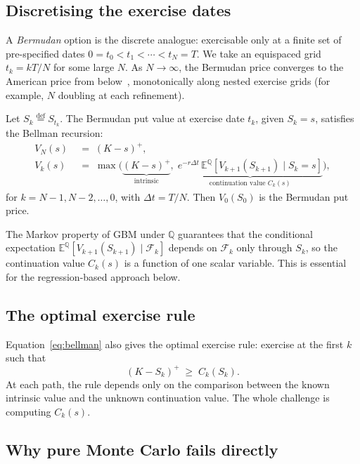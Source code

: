 \documentclass[11pt,a4paper]{article}
\theoremstyle{plain}
\theoremstyle{definition}
\theoremstyle{remark}
\newcommand{\E}{\mathbb{E}}
\newcommand{\F}{\mathcal{F}}
\newcommand{\Q}{\mathbb{Q}}
\newcommand{\eqdef}{\overset{\mathrm{def}}{=}}
\begin{document}
\subsection{Discretising the exercise dates}

A \emph{Bermudan} option is the discrete analogue: exercisable only at
a finite set of pre-specified dates $0 = t_0 < t_1 < \cdots < t_N = T$.
We take an equispaced grid $t_k = kT/N$ for some large $N$. As $N \to
\infty$, the Bermudan price converges to the American price
from below~\cite[Section 8.1]{Glasserman}, monotonically along nested
exercise grids (for example, $N$ doubling at each refinement).

Let $S_k \eqdef S_{t_k}$. The Bermudan put value at exercise date
$t_k$, given $S_k = s$, satisfies the Bellman recursion:
\begin{equation}
\boxed{
\begin{aligned}
V_N(s) \;&=\; (K - s)^+, \\[0.4em]
V_k(s) \;&=\; \max\!\bigl( \underbrace{(K - s)^+}_{\text{intrinsic}},\;
\underbrace{e^{-r\Delta t}\,\E^\Q[V_{k+1}(S_{k+1}) \mid S_k = s]}_{\text{continuation value }C_k(s)} \bigr),
\end{aligned}
}
\label{eq:bellman}
\end{equation}
for $k = N - 1, N - 2, \ldots, 0$, with $\Delta t = T/N$. Then
$V_0(S_0)$ is the Bermudan put price.

The Markov property of GBM under $\Q$ guarantees that the conditional
expectation $\E^\Q[V_{k+1}(S_{k+1}) \mid \F_k]$ depends on $\F_k$
only through $S_k$, so the continuation value $C_k(s)$ is a function
of one scalar variable. This is essential for the regression-based
approach below.

\subsection{The optimal exercise rule}

Equation~\eqref{eq:bellman} also gives the optimal exercise rule:
exercise at the first $k$ such that
\[
(K - S_k)^+ \;\ge\; C_k(S_k).
\]
At each path, the rule depends only on the comparison between the
known intrinsic value and the unknown continuation value. The whole
challenge is computing $C_k(s)$.

\subsection{Why pure Monte Carlo fails directly}
\end{document}

